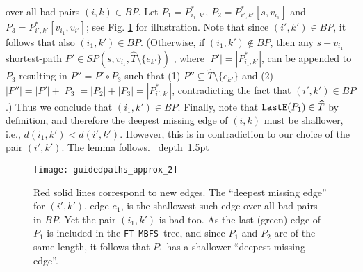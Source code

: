 \documentclass[12pt]{article}
\def\blackslug{\hbox{\hskip 1pt \vrule width 4pt height 8pt
    depth 1.5pt \hskip 1pt}}
\def\QED{\quad\blackslug\lower 8.5pt\null\par}
\def\LastE{\mbox{\tt LastE}}
\def\FTMBFS{\mbox{\tt FT-MBFS}}
\begin{document}
over all bad pairs $(i,k) \in BP$.
Let $P_1=P^{*}_{i_1,k'}$, $P_2=P^{*}_{i',k'}[s,v_{i_1}]$ and
$P_3=P^{*}_{i',k'}[v_{i_1}, v_{i'}]$;
see Fig. \ref{fig:guidedpaths} for illustration.
Note that since $(i',k') \in BP$, it follows that also $(i_1, k') \in BP$.
(Otherwise, if $(i_1, k') \notin BP$, then any $s-v_{i_1}$ shortest-path
$P' \in SP(s, v_{i_1}, \widehat{T} \setminus \{e_{k'}\})$
, where $|P'|=|P^*_{i_1,k'}|$, can be appended to $P_3$ resulting in
$P''=P' \circ P_3$
such that (1) $P'' \subseteq \widehat{T}\setminus \{e_{k'}\}$ and (2)
$|P''|=|P'|+|P_3|=|P_2|+|P_3|=|P^{*}_{i',k'}|$, contradicting the fact that
$(i',k') \in BP$.)
Thus we conclude that $(i_1, k') \in BP$.
Finally, note that $\LastE(P_1) \in \widehat{T}$ by definition, and therefore
the deepest missing edge of $(i,k)$ must be shallower, i.e.,
$d(i_1,k')<d(i',k')$. However, this is in contradiction to our choice
of the pair $(i',k')$. The lemma follows.
\QED

\begin{figure}[htb!]
\begin{center}
\texttt{[image: guidedpaths\_approx\_2]}
\caption{\label{fig:guidedpaths}
Red solid lines correspond to new edges.
The ``deepest missing edge'' for $(i',k')$, edge $e_1$, is the shallowest
such edge over all bad pairs in $BP$. Yet the pair $(i_1,k')$ is bad too.
As the last (green) edge of $P_1$ is included in the \FTMBFS\ tree,
and since $P_1$ and $P_2$ are of the same length, it follows that $P_1$
has a shallower ``deepest missing edge''.}
\end{center}
\end{figure}
\end{document}
